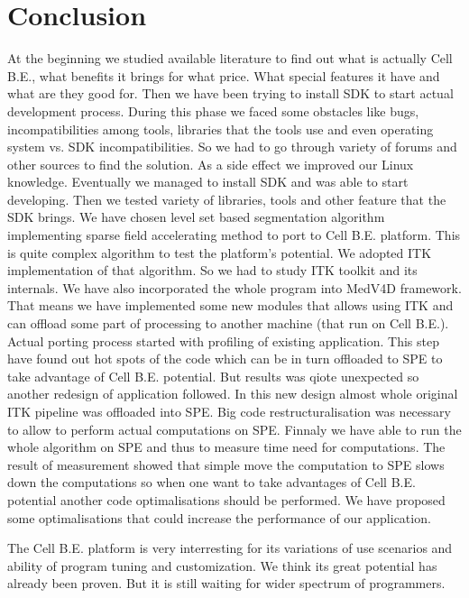 \chapter{Conclusion}

At the beginning we studied available literature to find out what is actually Cell B.E., what benefits it brings for what price.
What special features it have and what are they good for.
Then we have been trying to install SDK to start actual development process.
During this phase we faced some obstacles like bugs, incompatibilities among tools, libraries that the tools use and even operating system vs. SDK incompatibilities.
So we had to go through variety of forums and other sources to find the solution.
As a side effect we improved our Linux knowledge.
Eventually we managed to install SDK and was able to start developing.
Then we tested variety of libraries, tools and other feature that the SDK brings.
We have chosen level set based segmentation algorithm implementing sparse field accelerating method to port to Cell B.E. platform.
This is quite complex algorithm to test the platform's potential.
We adopted ITK implementation of that algorithm.
So we had to study ITK toolkit and its internals.
We have also incorporated the whole program into MedV4D framework.
That means we have implemented some new modules that allows using ITK and can offload some part of processing to another machine (that run on Cell B.E.).
Actual porting process started with profiling of existing application.
This step have found out hot spots of the code which can be in turn offloaded to SPE to take advantage of Cell B.E. potential.
But results was qiote unexpected so another redesign of application followed.
In this new design almost whole original ITK pipeline was offloaded into SPE.
Big code restructuralisation was necessary to allow to perform actual computations on SPE.
Finnaly we have able to run the whole algorithm on SPE and thus to measure time need for computations.
The result of measurement showed that simple move the computation to SPE slows down the computations so when one want to take advantages of Cell B.E. potential another code optimalisations should be performed.
We have proposed some optimalisations that could increase the performance of our application.

\par
The Cell B.E. platform is very interresting for its variations of use scenarios and ability of program tuning and customization.
We think its great potential has already been proven.
But it is still waiting for wider spectrum of programmers.

